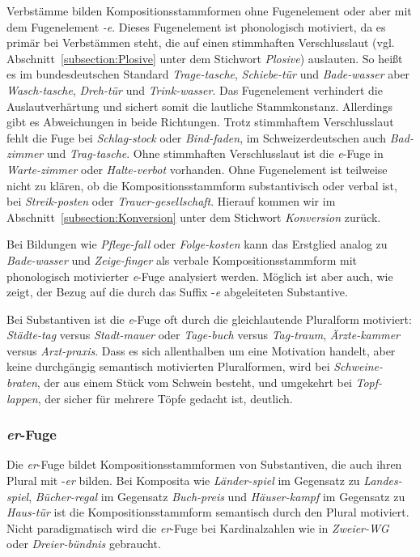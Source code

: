 Verbstämme bilden Kompositionsstammformen ohne Fugenelement oder aber mit dem Fugenelement \textit{-e}. Dieses Fugenelement ist phonologisch motiviert, da es primär bei Verbstämmen steht, die auf einen stimmhaften Verschlusslaut (vgl. Abschnitt~\ref{subsection:Plosive} unter dem Stichwort \textit{Plosive}) auslauten. So heißt es im bundesdeutschen Standard \textit{Trage-tasche}, \textit{Schiebe-tür} und \textit{Bade-wasser} aber \textit{Wasch-tasche}, \textit{Dreh-tür} und \textit{Trink-wasser}. Das Fugenelement verhindert die Auslautverhärtung und sichert somit die lautliche Stammkonstanz. Allerdings gibt es Abweichungen in beide Richtungen. Trotz stimmhaftem Verschlusslaut fehlt die Fuge bei \textit{Schlag-stock} oder \textit{Bind-faden}, im Schweizerdeutschen auch \textit{Bad-zimmer} und \textit{Trag-tasche}. Ohne stimmhaften Verschlusslaut ist die \textit{e}-Fuge in \textit{Warte-zimmer} oder \textit{Halte-verbot} vorhanden. Ohne Fugenelement ist teilweise nicht zu klären, ob die Kompositionsstammform substantivisch oder verbal ist, \zB bei \textit{Streik-posten} oder \textit{Trauer-gesellschaft}. Hierauf kommen wir im Abschnitt~\ref{subsection:Konversion} unter dem Stichwort \textit{Konversion} zurück. 

Bei Bildungen wie \textit{Pflege-fall} oder \textit{Folge-kosten} kann das Erstglied analog zu \textit{Bade-wasser} und \textit{Zeige-finger} als verbale Kompositionsstammform mit phonologisch motivierter \textit{e}-Fuge analysiert werden. Möglich ist aber auch, wie \citet[543]{Fuhrhop1996} zeigt, der Bezug auf die durch das Suffix -\textit{e} abgeleiteten Substantive.


Bei Substantiven ist die \textit{e}-Fuge oft durch die gleichlautende Pluralform motiviert: \textit{Städte-tag} versus \textit{Stadt-mauer} oder \textit{Tage-buch} versus \textit{Tag-traum}, \textit{Ärzte-kammer} versus \textit{Arzt-praxis}. Dass es sich allenthalben um eine Motivation handelt, aber keine durchgängig semantisch motivierten Pluralformen, wird bei \textit{Schweine-braten}, der aus einem Stück vom Schwein besteht, und umgekehrt bei \textit{Topf-lappen}, der sicher für mehrere Töpfe gedacht ist, deutlich.


\subsubsection{\textit{er}-Fuge}\label{subsubsection:er-Fuge}

Die \textit{er}-Fuge bildet Kompositionsstammformen von Substantiven, die auch ihren Plural mit -\textit{er} bilden. Bei Komposita wie \textit{Länder-spiel} im Gegensatz zu \textit{Landes-spiel}, \textit{Bücher-regal} im Gegensatz \textit{Buch-preis} und \textit{Häuser-kampf} im Gegensatz zu \textit{Haus-tür} ist die Kompositionsstammform semantisch durch den Plural motiviert. Nicht paradigmatisch wird die \textit{er}-Fuge bei Kardinalzahlen wie in \textit{Zweier-WG} oder \textit{Dreier-bündnis} gebraucht.


